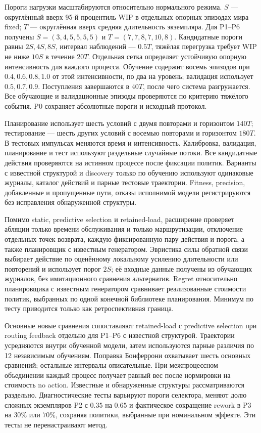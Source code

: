 Пороги нагрузки масштабируются относительно нормального режима. $S$ — округлённый вверх 95-й процентиль WIP в отдельных опорных эпизодах мира fixed; $T$ — округлённая вверх средняя длительность экземпляра. Для P1--P6 получены $S=(3,4,5,5,5,5)$ и $T=(7,7,8,7,10,8)$. Кандидатные пороги равны $2S,4S,8S$, интервал наблюдений — $0.5T$, тяжёлая перегрузка требует WIP не ниже $10S$ в течение $20T$. Отдельная сетка определяет устойчивую опорную интенсивность для каждого процесса. Обучение содержит восемь эпизодов при $0.4,0.6,0.8,1.0$ от этой интенсивности, по два на уровень; валидация использует $0.5,0.7,0.9$. Поступления завершаются в $40T$, после чего система разгружается. Все обучающие и валидационные эпизоды проверяются по критерию тяжёлого события. P0 сохраняет абсолютные пороги и исходный протокол.

Планирование использует шесть условий с двумя повторами и горизонтом $140T$; тестирование — шесть других условий с восемью повторами и горизонтом $180T$. В тестовых импульсах меняются время и интенсивность. Калибровка, валидация, планирование и тест используют раздельные случайные потоки. Все кандидатные действия проверяются на истинном процессе после фиксации политик. Варианты с известной структурой и discovery только по обучению используют одинаковые журналы, каталог действий и парные тестовые траектории. Fitness, precision, добавленные и пропущенные пути, отказы исполнимой модели регистрируются без исправления обнаруженной структуры.

Помимо static, predictive selection и retained-load, расширение проверяет абляции только времени обслуживания и только маршрутизации, отключение отдельных точек возврата, каждую фиксированную пару действия и порога, а также планировщик с известным генератором. Эвристика силы обратной связи выбирает действие по оценённому локальному усилению длительности или повторений и использует порог $2S$; её входные данные получены из обучающих журналов, без имитационного сравнения альтернатив. Regret относительно планировщика с известным генератором сравнивает реализованные стоимости политик, выбранных по одной конечной библиотеке планирования. Минимум по тесту приводится только как ретроспективная граница.

Основные новые сравнения сопоставляют retained-load с predictive selection при routing feedback отдельно для P1--P6 с известной структурой. Траектории усредняются внутри обученной модели, затем используются парные различия по 12 независимым обучениям. Поправка Бонферрони охватывает шесть основных сравнений; остальные интервалы описательные. При межпроцессном объединении каждый процесс получает равный вес после нормировки на стоимость no action. Известные и обнаруженные структуры рассматриваются раздельно. Диагностические тесты варьируют пороги селектора, меняют долю сложных экземпляров P2 с $0.35$ на $0.65$ и фактическое сокращение rework в P3 на $30\%$ или $70\%$, сохраняя политики, выбранные при номинальном эффекте. Эти тесты не перенастраивают метод.
